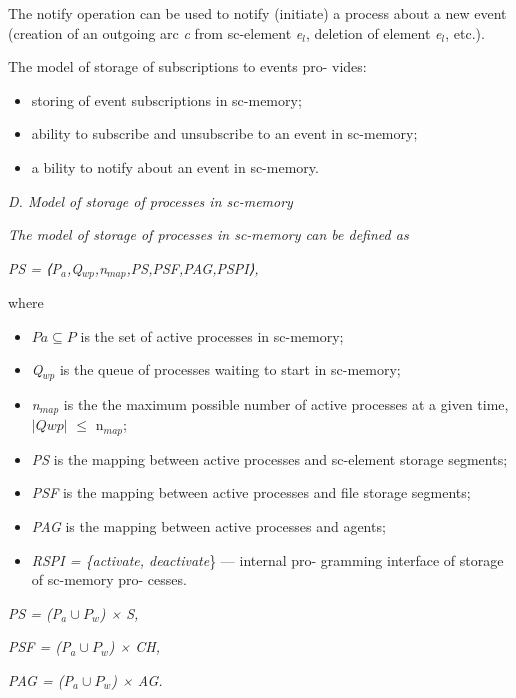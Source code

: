 \documentclass[10pt, a4paper]{article}
\begin{document}
\begin{multicols}{2}
The notify operation can be used to notify (initiate) a process about a new event (creation of an outgoing arc \textit{c} from sc-element \textit{e$_{l}$}, deletion of element \textit{e$_{l}$}, etc.).

The model of storage of subscriptions to events pro- vides:
\begin{itemize}
\setlength{\parskip}{0pt}
\setlength{\itemsep}{0pt}
    \item storing of event subscriptions in sc-memory;
    \item ability to subscribe and unsubscribe to an event in
sc-memory;
    \item a bility to notify about an event in sc-memory.
\end{itemize}
\textit{D. Model of storage of processes in sc-memory}


\textit{The model of storage of processes in sc-memory can
be defined as}
\begin{center}
    \textit{PS = ⟨P$_{a}$,Q$_{wp}$,n$_{map}$,PS,PSF,PAG,PSPI⟩,}
\end{center}
where
\begin{itemize}
\setlength{\parskip}{0pt}
\setlength{\itemsep}{0pt}
    \item \textit{$Pa \subseteq P$} is the set of active processes in sc-memory;
    \item \textit{Q$_{wp}$} is the queue of processes waiting to start in
sc-memory;
    \item \textit{n$_{map}$} is the the maximum possible number of active
processes at a given time, $|Qwp|$ $\leq$ n$_{map}$;
    \item \textit{PS} is the mapping between active processes and
sc-element storage segments;
    \item \textit{PSF} is the mapping between active processes and
file storage segments;
    \item \textit{PAG} is the mapping between active processes and
agents;
    \item \textit{RSPI = \{activate, deactivate}\} — internal pro-
gramming interface of storage of sc-memory pro- cesses.
\end{itemize}

\begin{center}
\textit{PS = (P$_{a} \cup P_{w} $) × S,}

\textit{PSF = (P$_{a} \cup P_{w}$) × CH,}

\textit{PAG = (P$_{a} \cup P_{w}$) × AG.}

\end{center}


\end{multicols}
\end{document}
